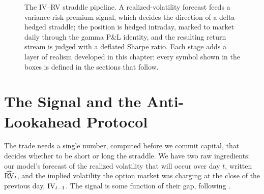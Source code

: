\begin{figure}[ht]
\centering
{}
\caption{The IV--RV straddle pipeline. A realized-volatility forecast feeds a variance-risk-premium signal, which decides the direction of a delta-hedged straddle; the position is hedged intraday, marked to market daily through the gamma P\&L identity, and the resulting return stream is judged with a deflated Sharpe ratio. Each stage adds a layer of realism developed in this chapter; every symbol shown in the boxes is defined in the sections that follow.}
\label{fig:ivrv:pipeline}
\end{figure}

\section{The Signal and the Anti-Lookahead Protocol}
\label{sec:ivrv:signal}

The trade needs a single number, computed before we commit capital, that decides whether to be short or long the straddle. We have two raw ingredients: our model's forecast of the realized volatility that will occur over day $t$, written $\widehat{\operatorname{RV}}_t$, and the implied volatility the option market was charging at the close of the previous day, $\operatorname{IV}_{t-1}$. The signal is some function of their gap, following \citet{Pollok2025}.

